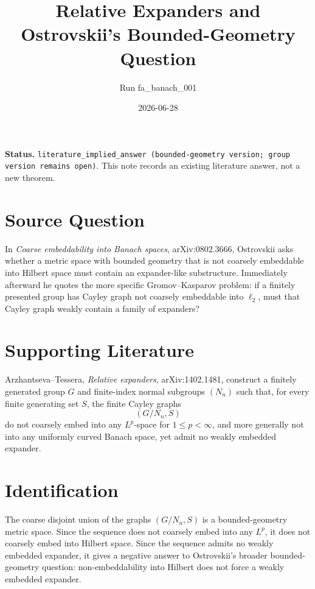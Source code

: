 \documentclass[11pt]{amsart}
\begin{document}
\title{Relative Expanders and Ostrovskii's Bounded-Geometry Question}
\author{Run fa\_banach\_001}
\date{2026-06-28}
\maketitle

\noindent
\textbf{Status.}
\texttt{literature\_implied\_answer (bounded-geometry version; group version remains open)}.
This note records an existing literature answer, not a new theorem.

\section*{Source Question}

In \emph{Coarse embeddability into Banach spaces}, arXiv:0802.3666,
Ostrovskii asks whether a metric space with bounded geometry that is not
coarsely embeddable into Hilbert space must contain an expander-like
substructure. Immediately afterward he quotes the more specific
Gromov--Kasparov problem: if a finitely presented group has Cayley graph not
coarsely embeddable into \(\ell_2\), must that Cayley graph weakly contain a
family of expanders?

\section*{Supporting Literature}

Arzhantseva--Tessera, \emph{Relative expanders}, arXiv:1402.1481, construct a
finitely generated group \(G\) and finite-index normal subgroups
\((N_n)\) such that, for every finite generating set \(S\), the finite Cayley
graphs
\[
  (G/N_n,S)
\]
do not coarsely embed into any \(L^p\)-space for \(1\le p<\infty\), and more
generally not into any uniformly curved Banach space, yet admit no weakly
embedded expander.

\section*{Identification}

The coarse disjoint union of the graphs \((G/N_n,S)\) is a bounded-geometry
metric space. Since the sequence does not coarsely embed into any \(L^p\),
it does not coarsely embed into Hilbert space. Since the sequence admits no
weakly embedded expander, it gives a negative answer to Ostrovskii's broader
bounded-geometry question: non-embeddability into Hilbert does not force a
weakly embedded expander.
\end{document}
